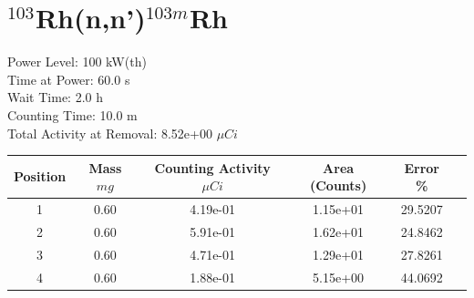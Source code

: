 \newpage

\section*{ $^{103}$Rh(n,n')$^{103m}$Rh }

Power Level: 100 kW(th) \\
Time at Power: 60.0 s \\
Wait Time:  2.0 h \\
Counting Time: 10.0 m \\
Total Activity at Removal: 8.52e+00 $\mu Ci$

\begin{table}[h]
\centering
\begin{tabular}{ |c|c|c|c|c|c| }
 \hline
 Position & Mass $mg$ & Counting Activity $\mu Ci$ & Area (Counts) & Error \% \\
 \hline 
 1 & 0.60 & 4.19e-01 & 1.15e+01 & 29.5207 \\ 
\hline
 2 & 0.60 & 5.91e-01 & 1.62e+01 & 24.8462 \\ 
\hline
 3 & 0.60 & 4.71e-01 & 1.29e+01 & 27.8261 \\ 
\hline
 4 & 0.60 & 1.88e-01 & 5.15e+00 & 44.0692 \\ 
\hline
\end{tabular}
\end{table}

